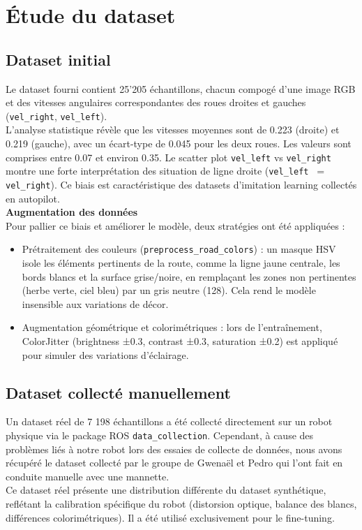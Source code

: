 \section{Étude du dataset}
\subsection{Dataset initial}
Le dataset fourni contient 25'205 échantillons, chacun compogé d'une image RGB et des vitesses angulaires correspondantes des roues droites et gauches (\texttt{vel\_right}, \texttt{vel\_left}). \\
L'analyse statistique révèle que les vitesses moyennes sont de 0.223 (droite) et 0.219 (gauche), avec un écart-type de 0.045 pour les deux roues. Les valeurs sont comprises entre 0.07 et environ 0.35. Le scatter plot \texttt{vel\_left} vs \texttt{vel\_right} montre une forte interprétation des situation de ligne droite (\texttt{vel\_left} ~= \texttt{vel\_right}). Ce biais est caractéristique des datasets d'imitation learning collectés en autopilot.\\
\textbf{Augmentation des données}  \\
Pour pallier ce biais et améliorer le modèle, deux stratégies ont été appliquées :
\begin{itemize}
    \item Prétraitement des couleurs (\texttt{preprocess\_road\_colors}) : un masque HSV isole les éléments pertinents de la route, comme la ligne jaune centrale, les bords blancs et la surface grise/noire, en remplaçant les zones non pertinentes (herbe verte, ciel bleu) par un gris neutre (128). Cela rend le modèle insensible aux variations de décor.
    \item Augmentation géométrique et colorimétriques : lors de l'entraînement, ColorJitter (brightness ±0.3, contrast ±0.3, saturation ±0.2) est appliqué pour simuler des variations d'éclairage.
\end{itemize}
\subsection{Dataset collecté manuellement}
Un dataset réel de 7 198 échantillons a été collecté directement sur un robot physique via le package ROS \texttt{data\_collection}. Cependant,  à cause des problèmes liés à notre robot lors des essaies de collecte de données, nous avons récupéré le dataset collecté par le groupe de Gwenaël et Pedro qui l'ont fait en conduite manuelle avec une mannette. \\  
Ce dataset réel présente une distribution différente du dataset synthétique, reflétant la calibration spécifique du robot (distorsion optique, balance des blancs, différences colorimétriques). Il a été utilisé exclusivement pour le fine-tuning. \\
